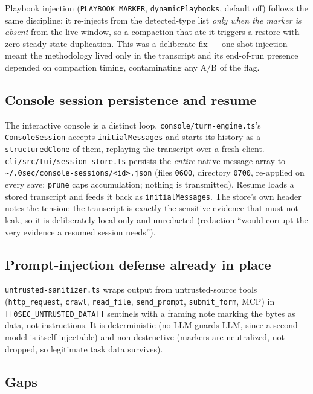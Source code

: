 \documentclass[11pt]{article}
\begin{document}
Playbook injection (\texttt{PLAYBOOK\_MARKER}, \texttt{dynamicPlaybooks},
default off) follows the same discipline: it re-injects from the detected-type
list \emph{only when the marker is absent} from the live window, so a compaction
that ate it triggers a restore with zero steady-state duplication. This was a
deliberate fix --- one-shot injection meant the methodology lived only in the
transcript and its end-of-run presence depended on compaction timing,
contaminating any A/B of the flag.

\subsection{Console session persistence and resume}

The interactive console is a distinct loop. \texttt{console/turn-engine.ts}'s
\texttt{ConsoleSession} accepts \texttt{initialMessages} and starts its history
as a \texttt{structuredClone} of them, replaying the transcript over a fresh
client. \texttt{cli/src/tui/session-store.ts} persists the \emph{entire} native
message array to \texttt{\~{}/.0sec/console-sessions/<id>.json} (files
\texttt{0600}, directory \texttt{0700}, re-applied on every save; \texttt{prune}
caps accumulation; nothing is transmitted). Resume loads a stored transcript and
feeds it back as \texttt{initialMessages}. The store's own header notes the
tension: the transcript is exactly the sensitive evidence that must not leak, so
it is deliberately local-only and unredacted (redaction ``would corrupt the very
evidence a resumed session needs'').

\subsection{Prompt-injection defense already in place}

\texttt{untrusted-sanitizer.ts} wraps output from untrusted-source tools
(\texttt{http\_request}, \texttt{crawl}, \texttt{read\_file}, \texttt{send\_prompt},
\texttt{submit\_form}, MCP) in \texttt{[[0SEC\_UNTRUSTED\_DATA]]} sentinels with a
framing note marking the bytes as data, not instructions. It is deterministic
(no LLM-guards-LLM, since a second model is itself injectable) and
non-destructive (markers are neutralized, not dropped, so legitimate task data
survives).

\subsection{Gaps}
\end{document}
